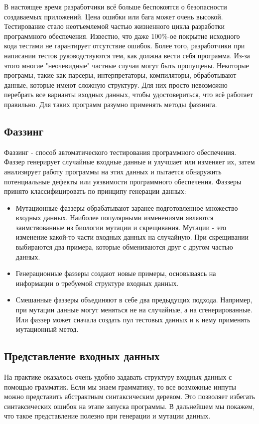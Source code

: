 \documentclass[a4paper]{article}
\begin{document}
В настоящее время разработчики всё больше беспокоятся о безопасности создаваемых приложений. Цена ошибки или бага может очень высокой. Тестирование стало неотъемлемой частью жизненного цикла разработки программного обеспечения. Известно, что даже 100\%-ое покрытие исходного кода тестами не гарантирует отсутствие ошибок. Более того, разработчики при написании тестов руководствуются тем, как должна вести себя программа. Из-за этого многие "неочевидные" частные случаи могут быть пропущены. Некоторые програмы, такие как парсеры, интерпретаторы, компиляторы, обработывают данные, которые имеют сложную структуру. Для них просто невозможно перебрать все варианты входных данных, чтобы удостовериться, что всё работает правильно. Для таких программ разумно применять методы фаззинга.

\subsection{Фаззинг}
\indent

Фаззинг - способ автоматического тестирования программного обеспечения. Фаззер генерирует случайные входные данные и улучшает или изменяет их, затем анализирует работу программы на этих данных и пытается обнаружить потенциальные дефекты или уязвимости программного обеспечения. Фаззеры принято классифицировать по принципу генерации данных:

\begin{itemize}
\item Мутационные фаззеры обрабатывают заранее подготовленное множество входных данных. Наиболее популярными изменениями являются заимствованные из биологии мутации и скрещивания. Мутации - это изменение какой-то части входных данных на случайную. При скрещивании выбираются два примера, которые обмениваются друг с другом частью данных.
\item Генерационные фаззеры создают новые примеры, основываясь на информации о требуемой структуре входных данных. 
\item Смешанные фаззеры объединяют в себе два предыдущих подхода. Например, при мутации данные могут меняться не на случайные, а на сгенерированные. Или фаззер может сначала создать пул тестовых данных и к нему применять мутационный метод. 
\end{itemize}

\subsection{Представление входных данных}
\indent

На практике оказалось очень удобно задавать структуру входных данных с помощью грамматик. Если мы знаем грамматику, то все возможные инпуты можно представить абстрактным синтаксическим деревом. Это позволяет избегать синтаксических ошибок на этапе запуска программы. В дальнейшем мы покажем, что такое представление полезно при генерации и мутации данных.

 
\end{document}

